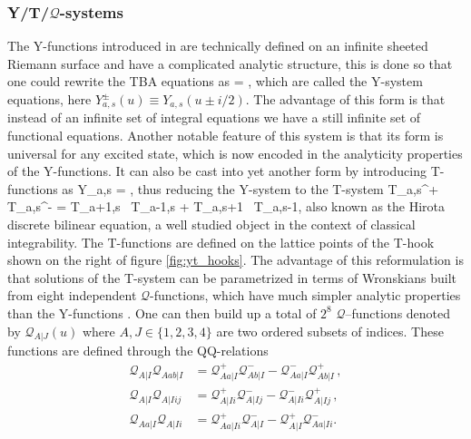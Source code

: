 \subsubsection{Y/T/$\mathcal{Q}$-systems}

The Y-functions introduced in  are technically defined on an infinite sheeted Riemann surface and have a complicated analytic structure, this is done so that one could rewrite the TBA equations as \cite{Gromov:2009bc, Cavaglia:2010nm}
\beq
	\label{eq:ysystem}
	 = ,
\eeq
which are called the Y-system equations, here $Y^\pm_{a,s}(u) \equiv Y_{a,s}(u \pm i/2)$.
The advantage of this form is that instead of an infinite set of integral equations we have a still infinite set of functional equations.
Another notable feature of this system is that its form is universal for any excited state, which is now encoded in the analyticity properties of the Y-functions. 
It can also be cast into yet another form by introducing T-functions as
\beq
	\label{eq:tyrelation}
	Y_{a,s} = ,
\eeq
thus reducing the Y-system to the T-system
\beq
	\label{eq:tsystem}
	T_{a,s}^+ \, T_{a,s}^- = T_{a+1,s} \, T_{a-1,s} + T_{a,s+1} \,  T_{a,s-1},
\eeq
also known as the Hirota discrete bilinear equation, a well studied object in the context of classical integrability.
The T-functions are defined on the lattice points of the T-hook shown on the right of figure \ref{fig:yt_hooks}.
The advantage of this reformulation is that solutions of the T-system can be parametrized in terms of Wronskians built from eight independent $\mathcal{Q}$-functions, which have much simpler analytic properties than the Y-functions \cite{Gromov:2010km}.
One can then build up a total of $2^8$ $\mathcal{Q}$--functions denoted by $\mathcal{Q}_{A|J}(u)$ where $A,J \in \{1,2,3,4\}$ are two ordered subsets of indices.
These functions are defined through the QQ-relations
\begin{subequations}\label{definingQQ}
    \begin{align}
       \label{QQbb}
       \mathcal{Q}_{A|I}\mathcal{Q}_{A ab|I} &=\mathcal{Q}_{A a|I}^{+} \mathcal{Q}_{A b|I}^{-}-
       \mathcal{Q}_{A a|I}^{-}
       \mathcal{Q}_{A b|I}^{+}\,,\\
       \label{QQff}
       \mathcal{Q}_{A|I}\mathcal{Q}_{A|I ij} &=\mathcal{Q}_{A|I i}^{+} \mathcal{Q}_{A|I j}^{-}-
       \mathcal{Q}_{A|I i}^{-} \mathcal{Q}_{A|I j}^{+}\,,\\
       \label{QQbf}
       \mathcal{Q}_{A a|I}\mathcal{Q}_{A|I i} &= \mathcal{Q}_{A a|I i}^{+}\mathcal{Q}_{A|I}^{-}-
       \mathcal{Q}_{A|I}^{+} \mathcal{Q}_{A a|I i}^{-}. \,
     \end{align}
\end{subequations} 
